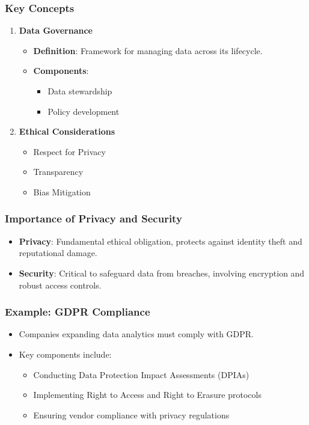 \documentclass[aspectratio=169]{beamer}
\begin{document}
\begin{frame}[fragile]
    \frametitle{Key Concepts}
    \begin{enumerate}
        \item \textbf{Data Governance}
            \begin{itemize}
                \item \textbf{Definition}: Framework for managing data across its lifecycle.
                \item \textbf{Components}:
                    \begin{itemize}
                        \item Data stewardship
                        \item Policy development
                    \end{itemize}
            \end{itemize}
        \item \textbf{Ethical Considerations}
            \begin{itemize}
                \item Respect for Privacy
                \item Transparency
                \item Bias Mitigation
            \end{itemize}
    \end{enumerate}
\end{frame}

\begin{frame}[fragile]
    \frametitle{Importance of Privacy and Security}
    \begin{itemize}
        \item \textbf{Privacy}: Fundamental ethical obligation, protects against identity theft and reputational damage.
        \item \textbf{Security}: Critical to safeguard data from breaches, involving encryption and robust access controls.
    \end{itemize}
\end{frame}

\begin{frame}[fragile]
    \frametitle{Example: GDPR Compliance}
    \begin{itemize}
        \item Companies expanding data analytics must comply with GDPR.
        \item Key components include:
            \begin{itemize}
                \item Conducting Data Protection Impact Assessments (DPIAs)
                \item Implementing Right to Access and Right to Erasure protocols
                \item Ensuring vendor compliance with privacy regulations
            \end{itemize}
    \end{itemize}
\end{frame}
\end{document}

